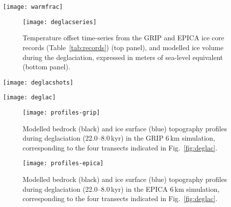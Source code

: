 \documentclass[tc, manuscript]{copernicus}
\newcommand{\todo}[1]{\emph{[\textbf{Todo:} #1]}}
\begin{document}
\begin{figure*}
  \texttt{[image: warmfrac]}
  \caption{Modelled fraction of warm-based ice cover during the ice-covered
           period. Note the dominance of warm-based conditions on the
           continental shelf and major glacial troughs of the coastal ranges.
           Hatches indicate areas that were covered by cold ice only.
           \todo{indicate location of the Skeena Mountains.}}
  \label{fig:warmfrac}
\end{figure*}

\begin{figure}
  \texttt{[image: deglacseries]}
  \caption{Temperature offset time-series from the GRIP and EPICA ice core
           records (Table~\ref{tab:records}) (top panel), and modelled ice
           volume during the deglaciation, expressed in meters of sea-level
           equivalent (bottom panel).}
  \label{fig:deglacseries}
\end{figure}

\begin{figure*}
  \texttt{[image: deglacshots]}
  \caption{Snapshots of modelled surface topography (200\,m contours)
           and surface velocity (colour mapping) during the last deglaciation
           from the GRIP (top panels) and EPICA (bottom panels) simulations.}
  \label{fig:deglacshots}
\end{figure*}

\begin{figure*}
  \texttt{[image: deglac]}
  \caption{Modelled age of the last deglaciation. Areas where the MIS~4 glacial
           advance exceeded the last glacial maximum advanced are marked in
           green. Hatches denote re-advance of mountain-centred ice caps and
           and the decaying ice sheet between 14 and 10\,kyr., which is more
           pronounced in the GRIP-driven simulation.}
  \label{fig:deglac}
\end{figure*}

\begin{figure}
  \texttt{[image: profiles-grip]}
  \caption{Modelled bedrock (black) and ice surface (blue) topography profiles
           during deglaciation (22.0--8.0\,kyr) in the GRIP 6\,km
           simulation, corresponding to the four transects indicated in
           Fig.~\ref{fig:deglac}.}
  \label{fig:profiles-grip}
\end{figure}

\begin{figure}
  \texttt{[image: profiles-epica]}
  \caption{Modelled bedrock (black) and ice surface (blue) topography profiles
           during deglaciation (22.0--8.0\,kyr) in the EPICA 6\,km
           simulation, corresponding to the four transects indicated in
           Fig.~\ref{fig:deglac}.}
  \label{fig:profiles-epica}
\end{figure}
\end{document}
